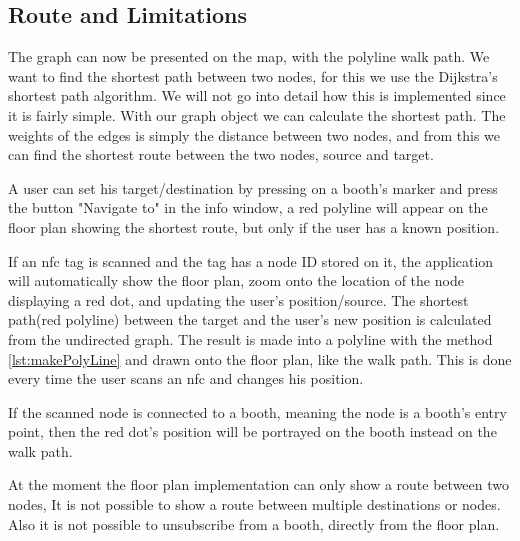 \subsection*{Route and Limitations}
The graph can now be presented on the map, with the polyline walk path. We want to find the shortest path between two nodes, for this we use the Dijkstra's shortest path algorithm. We will not go into detail how this is implemented since it is fairly simple. With our graph object we can calculate the shortest path. The weights of the edges is simply the distance between two nodes, and from this we can find the shortest route between the two nodes, source and target.

A user can set his target/destination by pressing on a booth's marker and press the button "Navigate to" in the info window, a red polyline will appear on the floor plan showing the shortest route, but only if the user has a known position.

If an \ac{nfc} tag is scanned and the tag has a node ID stored on it, the application will automatically show the floor plan, zoom onto the location of the node displaying a red dot, and updating the user's position/source. The shortest path(red polyline) between the target and the user's new position is calculated from the undirected graph. The result is made into a polyline with the method  \autoref{lst:makePolyLine} and drawn onto the floor plan, like the walk path. This is done every time the user scans an \ac{nfc} and changes his position.

If the scanned node is connected to a booth, meaning the node is a booth's entry point, then the red dot's position will be portrayed on the booth instead on the walk path.

At the moment the floor plan implementation can only show a route between two nodes, It is not possible to show a route between multiple destinations or nodes. Also it is not possible to unsubscribe from a booth, directly from the floor plan.







	
